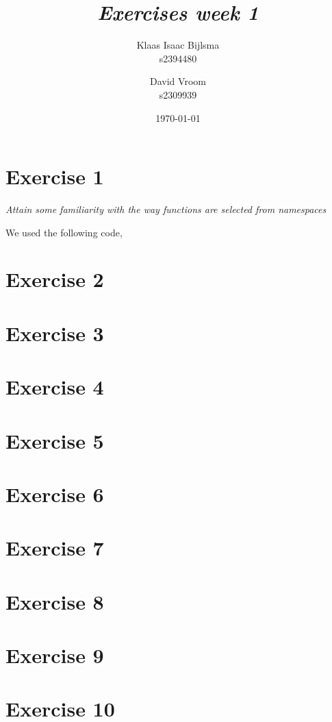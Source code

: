 \documentclass[12pt]{article}
\title{\itshape Exercises week 1}
\author{
	Klaas Isaac Bijlsma \\ s2394480
	\and
	David Vroom \\ s2309939
}
\date{\today}
\newcommand{\desc}[1]{\textit{#1} \vspace{1em}}
\begin{document}
\maketitle

\section*{Exercise 1}
\desc{Attain some familiarity with the way functions are selected from namespaces}

We used the following code,


\clearpage
\section*{Exercise 2}
\desc{}

\clearpage
\section*{Exercise 3}
\desc{}

\clearpage
\section*{Exercise 4}
\desc{}

\clearpage
\section*{Exercise 5}
\desc{}

\clearpage
\section*{Exercise 6}
\desc{}

\clearpage
\section*{Exercise 7}
\desc{}

\clearpage
\section*{Exercise 8}
\desc{}

\clearpage
\section*{Exercise 9}
\desc{}

\clearpage
\section*{Exercise 10}
\desc{}

\clearpage
\end{document}
